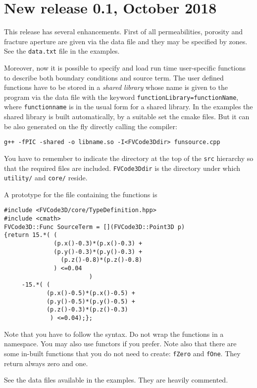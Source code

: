 \documentclass{article}
\newcommand{\li}{\lstinline}
\begin{document}
\section{New release 0.1, October 2018}
This release has several enhancements. First of all permeabilities, porosity and fracture aperture  are given 
via the data file and they may be specified by zones. See the \li!data.txt! file in the examples.

Moreover, now it is possible to specify and load run time user-specific functions to describe both boundary conditions and source term.
The user defined functions have to be stored in a \emph{shared library} whose name is given to the program via the data file with the keyword
\li!functionLibrary=functionName!, where \li!functionname! is in the usual form for a shared library. In the examples the shared library is built automatically, by a suitable set the cmake files. But it can be also generated on the fly directly calling the compiler:

\begin{verbatim}
g++ -fPIC -shared -o libname.so -I<FVCode3Ddir> funsource.cpp
\end{verbatim}

You have to remember to indicate the directory at the top of the \li!src! hierarchy so that the required files are included. \li!FVCode3Ddir! is the directory under which \li!utility/! and \li!core/! reside.

A prototype for the file containing the functions is

\begin{lstlisting}
#include <FVCode3D/core/TypeDefinition.hpp>
#include <cmath>
FVCode3D::Func SourceTerm = [](FVCode3D::Point3D p)
{return 15.*( (
              (p.x()-0.3)*(p.x()-0.3) +
              (p.y()-0.3)*(p.y()-0.3) +
                (p.z()-0.8)*(p.z()-0.8)
              ) <=0.04
                        )
     -15.*( (
            (p.x()-0.5)*(p.x()-0.5) +
            (p.y()-0.5)*(p.y()-0.5) +
            (p.z()-0.3)*(p.z()-0.3)
             ) <=0.04);};
\end{lstlisting}

Note that you have to follow the syntax. Do not wrap the functions in a namespace. You may also use functors if you prefer. Note also that there are some in-built functions that you do not need to create: \li!fZero! and \li!fOne!. They return always zero and one.

See the data files available in the examples. They are heavily commented.
\end{document}
